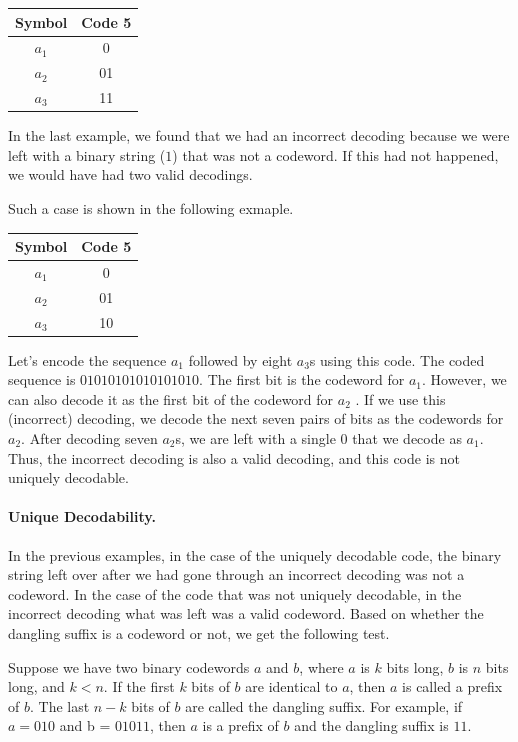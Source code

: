 \vspace{3mm}

\begin{tabular}{c|c}
    Symbol & Code 5 \\ \hline
    $a_1$ & 0 \\
    $a_2$ & 01 \\
    $a_3$ & 11
\end{tabular}

\vspace{3mm}

In the last example, we found that we had an incorrect decoding because we were left with a binary string ($1$) that was not a codeword. If this had not happened, we would have had two valid decodings.

Such a case is shown in the following exmaple.

\vspace{3mm}

\begin{tabular}{c|c}
    Symbol & Code 5 \\ \hline
    $a_1$ & 0 \\
    $a_2$ & 01 \\
    $a_3$ & 10
\end{tabular}

\vspace{3mm}

Let’s encode the sequence $a_1$ followed by eight $a_3$s using this code. The coded sequence is $01010101010101010$. The first bit is the codeword for $a_1$. However, we can also decode it as the first bit of the codeword for $a_2$ . If we use this (incorrect) decoding, we decode the next seven pairs of bits as the codewords for $a_2$. After decoding seven $a_2$s, we are left with a single $0$ that we decode as $a_1$. Thus, the incorrect decoding is also a valid decoding, and this code is not uniquely decodable.


\paragraph{Unique Decodability.} In the previous examples, in the case of the uniquely decodable code, the binary string left over after we had gone through an incorrect decoding was not a codeword. In the case of the code that was not uniquely decodable, in the incorrect decoding what was left was a valid codeword. Based on whether the dangling suffix is a codeword or not, we get the following test.

Suppose we have two binary codewords $a$ and $b$, where $a$ is $k$ bits long, $b$ is $n$ bits long, and $k < n$. If the first $k$ bits of $b$ are identical to $a$, then $a$ is called a prefix of $b$. The last $n - k$ bits of $b$ are called the dangling suffix. For example, if $a = 010$ and b = $01011$, then $a$ is a prefix of $b$ and the dangling suffix is $11$.

